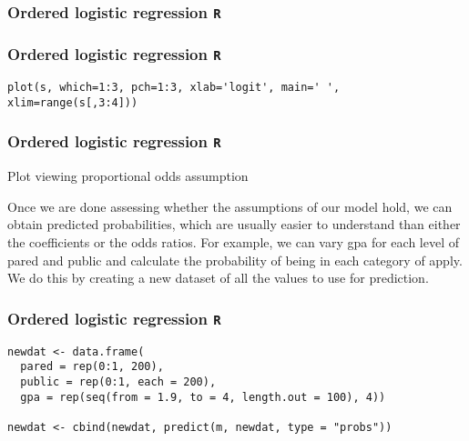 \documentclass[00-GLMregslides.tex]{subfiles}
\begin{document}
\begin{frame}[fragile]
	\frametitle{Ordered logistic regression \texttt{R} }
	\Large
\end{frame}

\begin{frame}[fragile]
	\frametitle{Ordered logistic regression \texttt{R} }
	\Large
\begin{framed}
\begin{verbatim}
plot(s, which=1:3, pch=1:3, xlab='logit', main=' ', xlim=range(s[,3:4]))
\end{verbatim}
\end{framed}
\end{frame}

\begin{frame}[fragile]
	\frametitle{Ordered logistic regression \texttt{R} }
	\Large
	
Plot viewing proportional odds assumption


Once we are done assessing whether the assumptions of our model hold, we can obtain predicted probabilities, which are usually easier to understand than either the coefficients or the odds ratios. For example, we can vary gpa for each level of pared and public and calculate the probability of being in each category of apply. We do this by creating a new dataset of all the values to use for prediction.
\end{frame}

\begin{frame}[fragile]
\frametitle{Ordered logistic regression \texttt{R} }
\Large
\begin{framed}
\begin{verbatim}
newdat <- data.frame(
  pared = rep(0:1, 200),
  public = rep(0:1, each = 200),
  gpa = rep(seq(from = 1.9, to = 4, length.out = 100), 4))

newdat <- cbind(newdat, predict(m, newdat, type = "probs"))

\end{verbatim}
\end{framed}

\end{frame}
\end{document}
